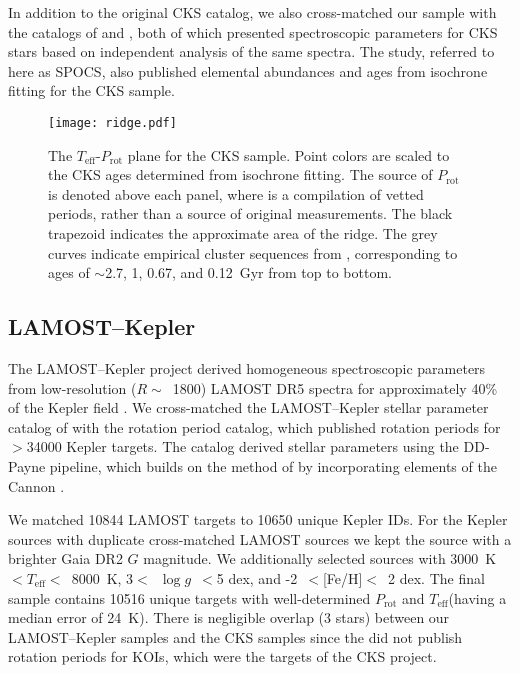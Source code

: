 \documentclass[linenumbers,tighten,trackchanges,twocolumn]{aastex631}
\newcommand{\teff}{\ensuremath{T_{\mathrm{eff}}}\xspace}
\newcommand{\logg}{\ensuremath{\log g}\xspace}
\newcommand{\prot}{\ensuremath{P_\mathrm{rot}}\xspace}
\begin{document}
In addition to the original CKS catalog, we also cross-matched our sample with the catalogs of \citet{Brewer2018} and \citet{Martinez2019}, both of which presented spectroscopic parameters for CKS stars based on independent analysis of the same spectra. The \citet{Brewer2018} study, referred to here as SPOCS, also published elemental abundances and ages from isochrone fitting for the CKS sample.

\begin{figure*}
    \centering
    \texttt{[image: ridge.pdf]}
    \caption{The \teff-\prot plane for the CKS sample. Point colors are scaled to the CKS ages determined from isochrone fitting. The source of \prot is denoted above each panel, where \citet{David2021} is a compilation of vetted periods, rather than a source of original measurements. The black trapezoid indicates the approximate area of the ridge. The grey curves indicate empirical cluster sequences from \citet{Curtis2020}, corresponding to ages of $\sim$2.7, 1, 0.67, and 0.12~Gyr from top to bottom.}
    \label{fig:ridge}
\end{figure*}

\subsection{LAMOST--Kepler} \label{sec:lamost}
The LAMOST--Kepler project derived homogeneous spectroscopic parameters from low-resolution ($R\sim$~1800) LAMOST DR5 spectra for approximately 40\% of the Kepler field \citep{Zong2018, Xiang2019}. We cross-matched the LAMOST--Kepler stellar parameter catalog of \citet{Xiang2019} with the \citet{McQuillan2014} rotation period catalog, which published rotation periods for $>$34000 Kepler targets. The \citet{Xiang2019} catalog derived stellar parameters using the DD-Payne pipeline, which builds on the method of \citet{Ting2017b} by incorporating elements of the Cannon \citep{Ness2015}. 

We matched 10844 LAMOST targets to 10650 unique Kepler IDs. For the Kepler sources with duplicate cross-matched LAMOST sources we kept the source with a brighter Gaia DR2 $G$ magnitude. We additionally selected sources with 3000~K$< \teff <$~8000~K, 3$<$~\logg~$<$5 dex, and -2~$<$[Fe/H]$<$~2 dex. The final sample contains 10516 unique targets with well-determined \prot and \teff (having a median error of 24~K). There is negligible overlap (3 stars) between our LAMOST--Kepler samples and the CKS samples since the \citet{McQuillan2014} did not publish rotation periods for KOIs, which were the targets of the CKS project. 
\end{document}
